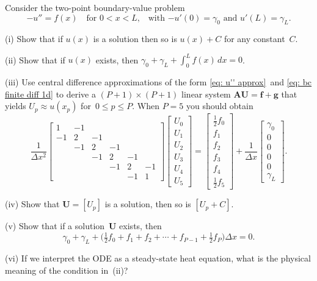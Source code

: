 \begin{Exercises}
\exercise
Consider the two-point boundary-value problem
\[
-u''=f(x)\quad\text{for $0<x<L$,}
	\quad\text{with $-u'(0)=\gamma_0$ and $u'(L)=\gamma_L$.}
\]
\begin{description}
\item{(i)} Show that if $u(x)$ is a solution then so is $u(x)+C$ for any 
constant~$C$.
\item{(ii)} Show that if $u(x)$ exists, then 
$\gamma_0+\gamma_L+\int_0^Lf(x)\,dx=0$.
\item{(iii)} Use central difference approximations of the 
form \eqref{eq: u'' approx}~and \eqref{eq: bc finite diff 1d} to derive a 
$(P+1)\times(P+1)$ linear system 
$\boldsymbol{A}\boldsymbol{U}=\boldsymbol{f}+\boldsymbol{g}$ that yields
$U_p\approx u(x_p)$ for~$0\le p\le P$.  When $P=5$ you should obtain
\[
\frac{1}{\Delta x^2}\begin{bmatrix}
 1&-1&  &  &  &\\                     
-1& 2&-1&  &  &\\
  &-1& 2&-1&  &\\
  &  &-1& 2&-1&\\
  &  &  &-1& 2&-1\\
  &  &  &  &-1& 1
\end{bmatrix}
\begin{bmatrix}U_0\\ U_1\\ U_2\\ U_3\\ U_4\\ U_5\end{bmatrix}
=\begin{bmatrix}\tfrac12f_0\\ f_1\\ f_2\\ f_3\\ f_4\\ \tfrac12 f_5
\end{bmatrix}
+\frac{1}{\Delta x}
\begin{bmatrix}\gamma_0\\ 0\\ 0\\ 0\\ 0\\ \gamma_L\end{bmatrix}.
\]
\item{(iv)} Show that $\boldsymbol{U}=[U_p]$ is a solution, then so is 
$[U_p+C]$.
\item{(v)} Show that if a solution~$\boldsymbol{U}$ exists, then
\[
\gamma_0+\gamma_L+\bigl(\tfrac12f_0+f_1+f_2+\cdots+f_{P-1}+\tfrac12f_P\bigr)
\Delta x=0.
\]
\item{(vi)} If we interpret the ODE as a steady-state heat equation, what is 
the physical meaning of the condition in~(ii)?
\end{description}


\end{Exercises}
